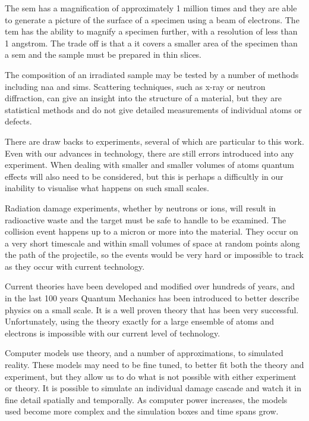 The \acrlong{sem} has a magnification of approximately 1 million times and they are able to generate a picture of the surface of a specimen using a beam of electrons.  The \acrlong{tem} has the ability to magnify a specimen further, with a resolution of less than 1 angstrom.  The trade off is that a it covers a smaller area of the specimen than a \acrshort{sem} and the sample must be prepared in thin slices.

The composition of an irradiated sample may be tested by a number of methods including \acrlong{naa} and \acrlong{sims}.  Scattering techniques, such as x-ray or neutron diffraction, can give an insight into the structure of a material, but they are statistical methods and do not give detailed measurements of individual atoms or defects.

There are draw backs to experiments, several of which are particular to this work.  Even with our advances in technology, there are still errors introduced into any experiment.  When dealing with smaller and smaller volumes of atoms quantum effects will also need to be considered, but this is perhaps a difficultly in our inability to visualise what happens on such small scales.  

Radiation damage experiments, whether by neutrons or ions, will result in radioactive waste and the target must be safe to handle to be examined.  The collision event happens up to a micron or more into the material.  They occur on a very short timescale and within small volumes of space at random points along the path of the projectile, so the events would be very hard or impossible to track as they occur with current technology.

Current theories have been developed and modified over hundreds of years, and in the last 100 years Quantum Mechanics has been introduced to better describe physics on a small scale.  It is a well proven theory that has been very successful.  Unfortunately, using the theory exactly for a large ensemble of atoms and electrons is impossible with our current level of technology.

Computer models use theory, and a number of approximations, to simulated reality.  These models may need to be fine tuned, to better fit both the theory and experiment, but they allow us to do what is not possible with either experiment or theory.  It is possible to simulate an individual damage cascade and watch it in fine detail spatially and temporally.  As computer power increases, the models used become more complex and the simulation boxes and time spans grow.


